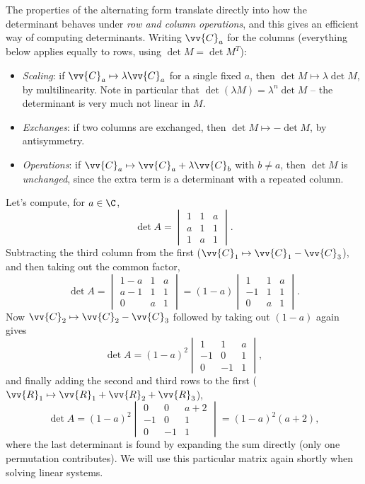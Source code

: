 The properties of the alternating form translate directly into how the determinant behaves under \emph{row and column operations}, and this gives an efficient way of computing determinants. Writing $\vv{C}_a$ for the columns (everything below applies equally to rows, using $\det M = \det M^T$):
\begin{itemize}
	\item \emph{Scaling}: if $\vv{C}_a \mapsto \lambda \vv{C}_a$ for a single fixed $a$, then $\det M \mapsto \lambda \det M$, by multilinearity. Note in particular that $\det (\lambda M) = \lambda^n \det M$ -- the determinant is very much not linear in $M$.
	\item \emph{Exchanges}: if two columns are exchanged, then $\det M \mapsto -\det M$, by antisymmetry.
	\item \emph{Operations}: if $\vv{C}_a \mapsto \vv{C}_a + \lambda \vv{C}_b$ with $b \neq a$, then $\det M$ is \emph{unchanged}, since the extra term is a determinant with a repeated column.
\end{itemize}

\begin{example}
	Let's compute, for $a \in \C$,
	$$
	\det A = \begin{vmatrix}
		1 & 1 & a \\ a & 1 & 1 \\ 1 & a & 1
	\end{vmatrix}.
	$$
	Subtracting the third column from the first ($\vv{C}_1 \mapsto \vv{C}_1 - \vv{C}_3$), and then taking out the common factor,
	$$
	\det A = \begin{vmatrix}
		1 - a & 1 & a \\ a - 1 & 1 & 1 \\ 0 & a & 1
	\end{vmatrix}
	= (1 - a)\begin{vmatrix}
		1 & 1 & a \\ -1 & 1 & 1 \\ 0 & a & 1
	\end{vmatrix}.
	$$
	Now $\vv{C}_2 \mapsto \vv{C}_2 - \vv{C}_3$ followed by taking out $(1 - a)$ again gives
	$$
	\det A = (1-a)^2\begin{vmatrix}
		1 & 1 & a \\ -1 & 0 & 1 \\ 0 & -1 & 1
	\end{vmatrix},
	$$
	and finally adding the second and third rows to the first ($\vv{R}_1 \mapsto \vv{R}_1 + \vv{R}_2 + \vv{R}_3$),
	$$
	\det A = (1 - a)^2 \begin{vmatrix}
		0 & 0 & a + 2 \\ -1 & 0 & 1 \\ 0 & -1 & 1
	\end{vmatrix} = (1-a)^2(a + 2),
	$$
	where the last determinant is found by expanding the sum directly (only one permutation contributes).
	We will use this particular matrix again shortly when solving linear systems.
\end{example}

